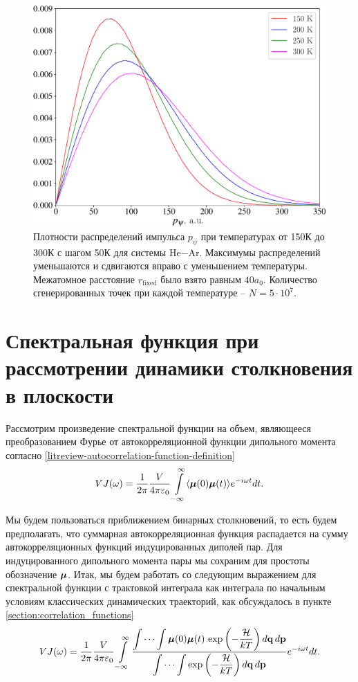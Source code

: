 \setcounter{figure}{2}
\begin{figure}[H]
    \centering
    \includegraphics[width=0.75\linewidth]{./pictures/two_atom_distributions/pPsi-crop.pdf}
    \caption{Плотности распределений импульса $p_\psi$ при температурах от 150К до 300К с шагом 50К для системы He$-$Ar. Максимумы распределений уменьшаются и сдвигаются вправо с уменьшением температуры. Межатомное расстояние $r_\text{fixed}$ было взято равным $40a_0$. Количество сгенерированных точек при каждой температуре -- $N = 5 \cdot 10^7$.}
    \label{fig:ppsi-distributions}
\end{figure}

\section{Спектральная функция при рассмотрении динамики столкновения в плоскости} \label{section:spectral_function_in_plane}

Рассмотрим произведение спектральной функции на объем, являющееся преобразованием Фурье от автокорреляционной функции дипольного момента согласно \eqref{litreview-autocorrelation-function-definition}   
\begin{gather}
    VJ(\omega) = \frac{1}{2 \pi} \frac{V}{4 \pi \varepsilon_0} \int\limits_{-\infty}^\infty \langle  \boldsymbol{\mu}(0) \boldsymbol{\mu}(t)  \rangle e^{-i \omega t} dt.
\end{gather}

Мы будем пользоваться приближением бинарных столкновений, то есть будем предполагать, что суммарная автокорреляционная функция распадается на сумму автокорреляционных функций индуцированных диполей пар. Для индуцированного дипольного момента пары мы сохраним для простоты  обозначение $\boldsymbol{\mu}$. Итак, мы будем работать со следующим выражением для спектральной функции с трактовкой интеграла как интеграла по начальным условиям классических динамических траекторий, как обсуждалось в пункте \ref{section:correlation_functions} 
\begin{gather}
    VJ(\omega) = \frac{1}{2\pi} \frac{V}{4 \pi \varepsilon_0} \int\limits_{-\infty}^\infty \frac{\displaystyle \idotsint \boldsymbol{\mu}(0) \boldsymbol{\mu}(t) \, \exp \left( -\frac{\mathcal{H}}{kT} \right) d\mathbf{q} \, d\mathbf{p}}{\displaystyle \idotsint \exp \left( -\frac{\mathcal{H}}{kT} \right) d\mathbf{q} \, d\mathbf{p}} e^{-i \omega t} dt. \label{two-atom-spectral-function1}
\end{gather}

